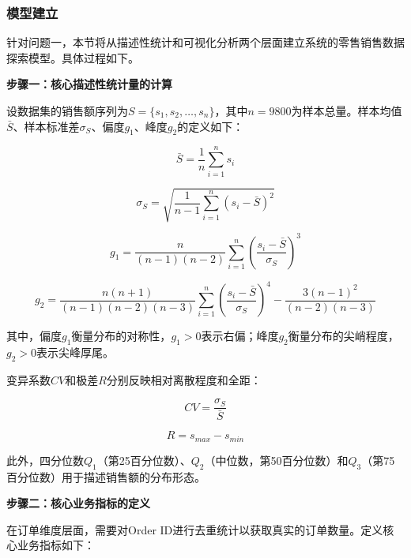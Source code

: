 

\subsubsection{模型建立}

针对问题一，本节将从描述性统计和可视化分析两个层面建立系统的零售销售数据探索模型。具体过程如下。

\textbf{步骤一：核心描述性统计量的计算}

设数据集的销售额序列为$S = \{s_1, s_2, \ldots, s_n\}$，其中$n=9800$为样本总量。样本均值$\bar{S}$、样本标准差$\sigma_S$、偏度$g_1$、峰度$g_2$的定义如下：

\begin{equation}
\bar{S} = \frac{1}{n} \sum_{i=1}^{n} s_i
\end{equation}

\begin{equation}
\sigma_S = \sqrt{\frac{1}{n-1} \sum_{i=1}^{n} (s_i - \bar{S})^2}
\end{equation}

\begin{equation}
g_1 = \frac{n}{(n-1)(n-2)} \sum_{i=1}^{n} \left(\frac{s_i - \bar{S}}{\sigma_S}\right)^3
\end{equation}

\begin{equation}
g_2 = \frac{n(n+1)}{(n-1)(n-2)(n-3)} \sum_{i=1}^{n} \left(\frac{s_i - \bar{S}}{\sigma_S}\right)^4 - \frac{3(n-1)^2}{(n-2)(n-3)}
\end{equation}

其中，偏度$g_1$衡量分布的对称性，$g_1>0$表示右偏；峰度$g_2$衡量分布的尖峭程度，$g_2>0$表示尖峰厚尾。

变异系数$CV$和极差$R$分别反映相对离散程度和全距：

\begin{equation}
CV = \frac{\sigma_S}{\bar{S}}
\end{equation}

\begin{equation}
R = s_{max} - s_{min}
\end{equation}

此外，四分位数$Q_1$（第25百分位数）、$Q_2$（中位数，第50百分位数）和$Q_3$（第75百分位数）用于描述销售额的分布形态。

\textbf{步骤二：核心业务指标的定义}

在订单维度层面，需要对Order ID进行去重统计以获取真实的订单数量。定义核心业务指标如下：

